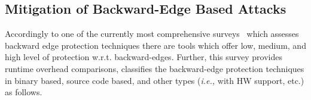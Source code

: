 % 

\subsection{Mitigation of Backward-Edge Based Attacks}
\label{Mitigation of Return Edge Attacks}
Accordingly to one of the currently most comprehensive surveys~\cite{cfi:survey} which assesses backward edge protection techniques there are tools which
offer low, medium, and high level of protection w.r.t. backward-edges. Further, this survey 
provides runtime overhead comparisons,
classifies the backward-edge protection techniques 
in binary based, source code based, and other types (\textit{i.e.,} with HW support, etc.) as follows.


